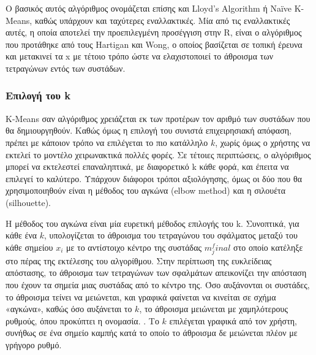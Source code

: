 \documentclass[greek, 12pt]{article}
\begin{document}
Ο βασικός αυτός αλγόριθμος ονομάζεται επίσης και Lloyd’s Algorithm ή Naïve K-Means, καθώς υπάρχουν και ταχύτερες εναλλακτικές. Μία από τις εναλλακτικές αυτές, η οποία αποτελεί την προεπιλεγμένη προσέγγιση στην R, είναι ο αλγόριθμος που προτάθηκε από τους Hartigan και Wong, ο οποίος βασίζεται σε τοπική έρευνα και μετακινεί τα x με τέτοιο τρόπο ώστε να ελαχιστοποιεί το άθροισμα των τετραγώνων εντός των συστάδων. \cite{hartigan1979algorithm}

\subsubsection{Επιλογή του k}

 K-Means σαν αλγόριθμος χρειάζεται εκ των προτέρων τον αριθμό των συστάδων που θα δημιουργηθούν. Καθώς όμως η επιλογή του συνιστά επιχειρησιακή απόφαση, πρέπει με κάποιον τρόπο να επιλέγεται το πιο κατάλληλο $k$, χωρίς όμως ο χρήστης να εκτελεί το μοντέλο χειρωνακτικά πολλές φορές. Σε τέτοιες περιπτώσεις, ο αλγόριθμος μπορεί να εκτελεστεί επαναληπτικά, με διαφορετικό k κάθε φορά, και έπειτα να επιλεγεί το καλύτερο. Υπάρχουν διάφοροι τρόποι αξιολόγησης, όμως οι δύο που θα χρησιμοποιηθούν είναι η μέθοδος του αγκώνα (elbow method) και η σιλουέτα (silhouette).

Η μέθοδος του αγκώνα είναι μία ευρετική μέθοδος επιλογής του k. Συνοπτικά, για κάθε ένα $k$, υπολογίζεται το άθροισμα του τετραγώνου του σφάλματος μεταξύ του κάθε σημείου $x_i$ με το αντίστοιχο κέντρο της συστάδας $m_j^final$ στο οποίο κατέληξε στο πέρας της εκτέλεσης του αλγορίθμου. Στην περίπτωση της ευκλείδειας απόστασης, το άθροισμα των τετραγώνων των σφαλμάτων απεικονίζει την απόσταση που έχουν τα σημεία μιας συστάδας από το κέντρο της. Όσο αυξάνονται οι συστάδες, το άθροισμα τείνει να μειώνεται, και γραφικά φαίνεται να κινείται σε σχήμα «αγκώνα», καθώς όσο αυξάνεται το $k$, το άθροισμα μειώνεται με χαμηλότερους ρυθμούς, όπου προκύπτει η ονομασία. \cite{syakur2018integration}. Το $k$ επιλέγεται γραφικά από τον χρήστη, συνήθως σε ένα σημείο καμπής κατά το οποίο το άθροισμα δε μειώνεται πλέον με γρήγορο ρυθμό.
\end{document}
